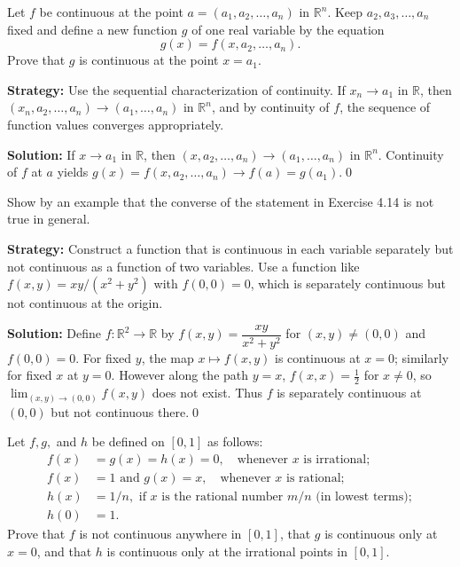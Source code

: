 \begin{problembox}
Let \( f \) be continuous at the point \( a = (a_1, a_2, \ldots, a_n) \) in \( \mathbb{R}^n \). Keep \( a_2, a_3, \ldots, a_n \) fixed and define a new function \( g \) of one real variable by the equation
\[g(x) = f(x, a_2, \ldots, a_n).\]
Prove that \( g \) is continuous at the point \( x = a_1 \).
\end{problembox}

\noindent\textbf{Strategy:} Use the sequential characterization of continuity. If $x_n \to a_1$ in $\mathbb{R}$, then $(x_n, a_2, \ldots, a_n) \to (a_1, \ldots, a_n)$ in $\mathbb{R}^n$, and by continuity of $f$, the sequence of function values converges appropriately.

\bigskip\noindent\textbf{Solution:}
If $x\to a_1$ in $\mathbb{R}$, then $(x,a_2,\ldots,a_n)\to(a_1,\ldots,a_n)$ in $\mathbb{R}^n$. Continuity of $f$ at $a$ yields $g(x)=f(x,a_2,\ldots,a_n)\to f(a)=g(a_1)$.\qed



\begin{problembox}
Show by an example that the converse of the statement in Exercise 4.14 is not true in general.
\end{problembox}

\noindent\textbf{Strategy:} Construct a function that is continuous in each variable separately but not continuous as a function of two variables. Use a function like $f(x,y) = xy/(x^2+y^2)$ with $f(0,0) = 0$, which is separately continuous but not continuous at the origin.

\bigskip\noindent\textbf{Solution:}
Define $f:\mathbb{R}^2\to\mathbb{R}$ by $f(x,y)=\dfrac{xy}{x^2+y^2}$ for $(x,y)\ne(0,0)$ and $f(0,0)=0$. For fixed $y$, the map $x\mapsto f(x,y)$ is continuous at $x=0$; similarly for fixed $x$ at $y=0$. However along the path $y=x$, $f(x,x)=\tfrac{1}{2}$ for $x\ne0$, so $\lim_{(x,y)\to(0,0)}f(x,y)$ does not exist. Thus $f$ is separately continuous at $(0,0)$ but not continuous there.\qed



\begin{problembox}
Let \( f, g, \) and \( h \) be defined on \([0, 1]\) as follows:
\begin{align*}
f(x) &= g(x) = h(x) = 0, \quad \text{whenever } x \text{ is irrational}; \\
f(x) &= 1 \text{ and } g(x) = x, \quad \text{whenever } x \text{ is rational}; \\
h(x) &= 1/n, \text{ if } x \text{ is the rational number } m/n \text{ (in lowest terms)}; \\
h(0) &= 1.
\end{align*}
Prove that \( f \) is not continuous anywhere in \([0, 1]\), that \( g \) is continuous only at \( x = 0 \), and that \( h \) is continuous only at the irrational points in \([0, 1]\).
\end{problembox}

